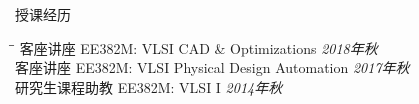 \begin{rSection}{授课经历}

\begin{tabbing}
\hspace{3.3in}\= \hspace{3.1in}\= \kill
客座讲座 \> EE382M: VLSI CAD \& Optimizations \> {\em 2018年秋 } \\
客座讲座 \> EE382M: VLSI Physical Design Automation \> {\em 2017年秋 } \\
研究生课程助教 \> EE382M: VLSI I \> {\em 2014年秋 }
\end{tabbing}

\end{rSection}
